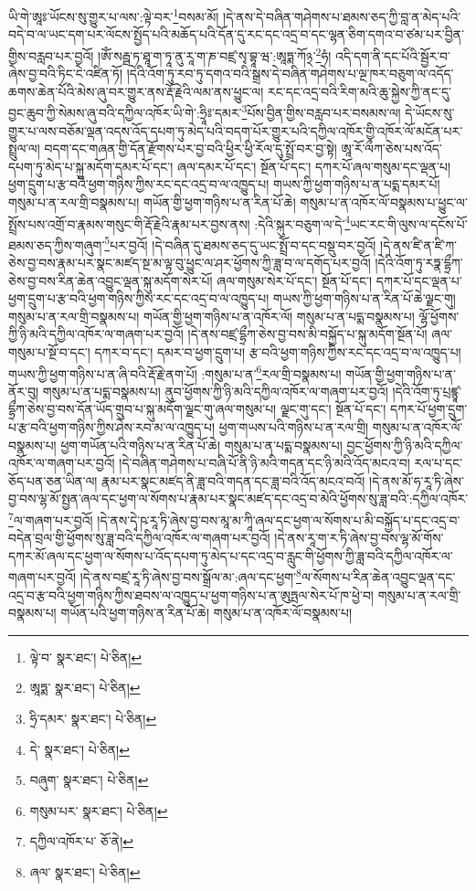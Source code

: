 ཡི་གེ་ཨཱཿ་ཡོངས་སུ་གྱུར་པ་ལས་:ལྟེ་བར་\footnote{ལྟེ་བ་  སྣར་ཐང་།  པེ་ཅིན། }བསམ་མོ། །དེ་ནས་དེ་བཞིན་གཤེགས་པ་ཐམས་ཅད་ཀྱི་བླ་ན་མེད་པའི་བདེ་བ་ལ་ཡང་དག་པར་ལོངས་སྤྱོད་པའི་མཆོད་པའི་དོན་དུ་རང་དང་འདྲ་བ་དང་ལྷན་ཅིག་དགའ་བ་ཙམ་པར་བྱིན་གྱིས་བརླབ་པར་བྱའོ། །ཨོཾ་སརྦྦ་ཏ་ཐཱ་ག་ཏཱ་ནུ་རཱ་ག་ཎ་བཛྲ་སྭ་བྷཱ་ཝ་:ཨཱཏྨ་ཀོ྅་\footnote{ཨཱཏྨ་  སྣར་ཐང་།  པེ་ཅིན། }ཧཾ། འདི་དག་ནི་དང་པོའི་སྦྱོར་བ་ཞེས་བྱ་བའི་ཏིང་ངེ་འཛིན་ཏོ། །དེའི་འོག་ཏུ་རབ་ཏུ་དགའ་བའི་སྒྲས་དེ་བཞིན་གཤེགས་པ་ལྔ་ཁར་བཅུག་ལ་འདོད་ཆགས་ཆེན་པོའི་མེས་ཞུ་བར་གྱུར་ནས་རྡོ་རྗེའི་ལམ་ནས་ཕྱུང་ལ། རང་དང་འདྲ་བའི་རིག་མའི་ཆུ་སྐྱེས་ཀྱི་ནང་དུ་བྱང་ཆུབ་ཀྱི་སེམས་ཞུ་བའི་དཀྱིལ་འཁོར་ཡི་གེ་:ཧྲཱིཿ་དམར་\footnote{ཧྲི་དམར་  སྣར་ཐང་།  པེ་ཅིན། }པོས་བྱིན་གྱིས་བརླབ་པར་བསམས་ལ། དེ་ཡོངས་སུ་གྱུར་པ་ལས་བཅོམ་ལྡན་འདས་འོད་དཔག་ཏུ་མེད་པའི་བདག་པོར་གྱུར་པའི་དཀྱིལ་འཁོར་གྱི་འཁོར་ལོ་མངོན་པར་སྤྲུལ་ལ། བདག་དང་གཞན་གྱི་དོན་རྫོགས་པར་བྱ་བའི་ཕྱིར་ཕྱི་རོལ་དུ་སྤྲོ་བར་བྱ་སྟེ། ཨཱ་རོ་ལྀཀ་ཅེས་པས་འོད་དཔག་ཏུ་མེད་པ་སྐུ་མདོག་དམར་པོ་དང་། ཞལ་དམར་པོ་དང་། སྔོན་པོ་དང་། དཀར་པོ་ཞལ་གསུམ་དང་ལྡན་པ། ཕྱག་དྲུག་པ་རྩ་བའི་ཕྱག་གཉིས་ཀྱིས་རང་དང་འདྲ་བ་ལ་འཁྱུད་པ། གཡས་ཀྱི་ཕྱག་གཉིས་པ་ན་པདྨ་དམར་པོ། གསུམ་པ་ན་རལ་གྲི་བསྣམས་པ། གཡོན་གྱི་ཕྱག་གཉིས་པ་ན་རིན་པོ་ཆེ། གསུམ་པ་ན་འཁོར་ལོ་བསྣམས་པ་ཕྱུང་ལ་སྤྲོས་པས་འགྲོ་བ་རྣམས་གསུང་གི་རྡོ་རྗེའི་རྣམ་པར་བྱས་ནས། :དེའི་སྐུར་བཅུག་ལ་དེ་\footnote{དེ་  སྣར་ཐང་།  པེ་ཅིན། }ཡང་རང་གི་ལུས་ལ་དངོས་པོ་ཐམས་ཅད་ཀྱིས་གཞུག་\footnote{བཞུག་  སྣར་ཐང་།  པེ་ཅིན། }པར་བྱའོ། །དེ་བཞིན་དུ་ཐམས་ཅད་དུ་ཡང་སྤྲོ་བ་དང་བསྡུ་བར་བྱའོ། །དེ་ནས་ཛི་ན་ཛི་ཀ་ཅེས་བྱ་བས་རྣམ་པར་སྣང་མཛད་སྔ་མ་ལྟ་བུ་ཕྱུང་ལ་ཤར་ཕྱོགས་ཀྱི་ཟླ་བ་ལ་དགོད་པར་བྱའོ། །དེའི་འོག་ཏུ་རཏྣ་དྷྲྀཀ་ཅེས་བྱ་བས་རིན་ཆེན་འབྱུང་ལྡན་སྐུ་མདོག་སེར་པོ། ཞལ་གསུམ་སེར་པོ་དང་། སྔོན་པོ་དང་། དཀར་པོ་དང་ལྡན་པ་ཕྱག་དྲུག་པ་རྩ་བའི་ཕྱག་གཉིས་ཀྱིས་རང་དང་འདྲ་བ་ལ་འཁྱུད་པ། གཡས་ཀྱི་ཕྱག་གཉིས་པ་ན་རིན་པོ་ཆེ་ལྗང་གུ། གསུམ་པ་ན་རལ་གྲི་བསྣམས་པ། གཡོན་གྱི་ཕྱག་གཉིས་པ་ན་འཁོར་ལོ། གསུམ་པ་ན་པདྨ་བསྣམས་པ། ལྷོ་ཕྱོགས་ཀྱི་ཉི་མའི་དཀྱིལ་འཁོར་ལ་གཞག་པར་བྱའོ། །དེ་ནས་བཛྲ་དྷྲྀཀ་ཅེས་བྱ་བས་མི་བསྐྱོད་པ་སྐུ་མདོག་སྔོན་པོ། ཞལ་གསུམ་པ་སྔོ་བ་དང་། དཀར་བ་དང་། དམར་བ་ཕྱག་དྲུག་པ། རྩ་བའི་ཕྱག་གཉིས་ཀྱིས་རང་དང་འདྲ་བ་ལ་འཁྱུད་པ། གཡས་ཀྱི་ཕྱག་གཉིས་པ་ན་ཞི་བའི་རྡོ་རྗེ་ནག་པོ། :གསུམ་པ་ན་\footnote{གསུམ་པར་  སྣར་ཐང་།  པེ་ཅིན། }རལ་གྲི་བསྣམས་པ། གཡོན་གྱི་ཕྱག་གཉིས་པ་ན་ནོར་བུ། གསུམ་པ་ན་པདྨ་བསྣམས་པ། ནུབ་ཕྱོགས་ཀྱི་ཉི་མའི་དཀྱིལ་འཁོར་ལ་གཞག་པར་བྱའོ། །དེའི་འོག་ཏུ་པྲཛྙཱ་དྷྲྀཀ་ཅེས་བྱ་བས་དོན་ཡོད་གྲུབ་པ་སྐུ་མདོག་ལྗང་གུ་ཞལ་གསུམ་པ། ལྗང་གུ་དང་། སྔོན་པོ་དང་། དཀར་པོ་ཕྱག་དྲུག་པ་རྩ་བའི་ཕྱག་གཉིས་ཀྱིས་ཤེས་རབ་མ་ལ་འཁྱུད་པ། ཕྱག་གཡས་པའི་གཉིས་པ་ན་རལ་གྲི། གསུམ་པ་ན་འཁོར་ལོ་བསྣམས་པ། ཕྱག་གཡོན་པའི་གཉིས་པ་ན་རིན་པོ་ཆེ། གསུམ་པ་ན་པདྨ་བསྣམས་པ། བྱང་ཕྱོགས་ཀྱི་ཉི་མའི་དཀྱིལ་འཁོར་ལ་གཞག་པར་བྱའོ། །དེ་བཞིན་གཤེགས་པ་བཞི་པོ་ནི་ཉི་མའི་གདན་དང་ཉི་མའི་འོད་མངའ་བ། རལ་པ་དང་ཅོད་པན་ཅན་ཡིན་ལ། རྣམ་པར་སྣང་མཛད་ནི་ཟླ་བའི་གདན་དང་ཟླ་བའི་འོད་མངའ་བའོ། །དེ་ནས་མོ་ཧ་རཱ་ཏི་ཞེས་བྱ་བས་ལྷ་མོ་སྤྱན་ཞལ་དང་ཕྱག་ལ་སོགས་པ་རྣམ་པར་སྣང་མཛད་དང་འདྲ་བ་མེའི་ཕྱོགས་སུ་ཟླ་བའི་:དཀྱིལ་འཁོར་\footnote{དཀྱིལ་འཁོར་པ་  ཅོ་ནེ། }ལ་གཞག་པར་བྱའོ། །དེ་ནས་དྭེ་ཥ་རཱ་ཏི་ཞེས་བྱ་བས་མཱ་མ་ཀཱི་ཞལ་དང་ཕྱག་ལ་སོགས་པ་མི་བསྐྱོད་པ་དང་འདྲ་བ་བདེན་བྲལ་གྱི་ཕྱོགས་སུ་ཟླ་བའི་དཀྱིལ་འཁོར་ལ་གཞག་པར་བྱའོ། །དེ་ནས་རཱ་ག་ར་ཏི་ཞེས་བྱ་བས་ལྷ་མོ་གོས་དཀར་མོ་ཞལ་དང་ཕྱག་ལ་སོགས་པ་འོད་དཔག་ཏུ་མེད་པ་དང་འདྲ་བ་རླུང་གི་ཕྱོགས་ཀྱི་ཟླ་བའི་དཀྱིལ་འཁོར་ལ་གཞག་པར་བྱའོ། །དེ་ནས་བཛྲ་རཱ་ཏི་ཞེས་བྱ་བས་སྒྲོལ་མ་:ཞལ་དང་ཕྱག་\footnote{ཞལ་  སྣར་ཐང་།  པེ་ཅིན། }ལ་སོགས་པ་རིན་ཆེན་འབྱུང་ལྡན་དང་འདྲ་བ་རྩ་བའི་ཕྱག་གཉིས་ཀྱིས་ཐབས་ལ་འཁྱུད་པ་ཕྱག་གཉིས་པ་ན་ཨུཏྤལ་སེར་པོ་ཁ་ཕྱེ་བ། གསུམ་པ་ན་རལ་གྲི་བསྣམས་པ། གཡོན་པའི་ཕྱག་གཉིས་ན་རིན་པོ་ཆེ། གསུམ་པ་ན་འཁོར་ལོ་བསྣམས་པ། 